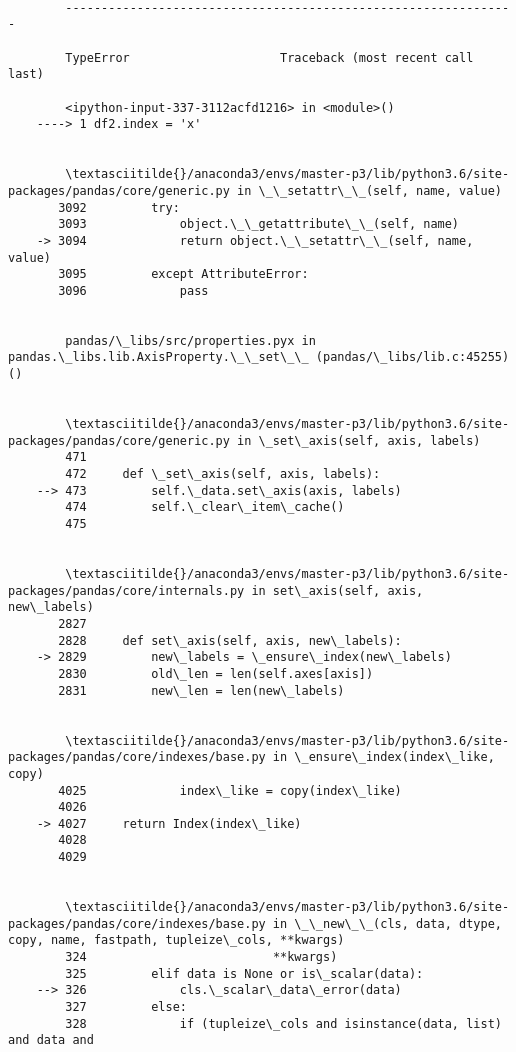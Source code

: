 \documentclass[11pt]{article}
\begin{document}
    \begin{Verbatim}[commandchars=\\\{\}]

        ---------------------------------------------------------------

        TypeError                     Traceback (most recent call last)

        <ipython-input-337-3112acfd1216> in <module>()
    ----> 1 df2.index = 'x'
    

        \textasciitilde{}/anaconda3/envs/master-p3/lib/python3.6/site-packages/pandas/core/generic.py in \_\_setattr\_\_(self, name, value)
       3092         try:
       3093             object.\_\_getattribute\_\_(self, name)
    -> 3094             return object.\_\_setattr\_\_(self, name, value)
       3095         except AttributeError:
       3096             pass


        pandas/\_libs/src/properties.pyx in pandas.\_libs.lib.AxisProperty.\_\_set\_\_ (pandas/\_libs/lib.c:45255)()


        \textasciitilde{}/anaconda3/envs/master-p3/lib/python3.6/site-packages/pandas/core/generic.py in \_set\_axis(self, axis, labels)
        471 
        472     def \_set\_axis(self, axis, labels):
    --> 473         self.\_data.set\_axis(axis, labels)
        474         self.\_clear\_item\_cache()
        475 


        \textasciitilde{}/anaconda3/envs/master-p3/lib/python3.6/site-packages/pandas/core/internals.py in set\_axis(self, axis, new\_labels)
       2827 
       2828     def set\_axis(self, axis, new\_labels):
    -> 2829         new\_labels = \_ensure\_index(new\_labels)
       2830         old\_len = len(self.axes[axis])
       2831         new\_len = len(new\_labels)


        \textasciitilde{}/anaconda3/envs/master-p3/lib/python3.6/site-packages/pandas/core/indexes/base.py in \_ensure\_index(index\_like, copy)
       4025             index\_like = copy(index\_like)
       4026 
    -> 4027     return Index(index\_like)
       4028 
       4029 


        \textasciitilde{}/anaconda3/envs/master-p3/lib/python3.6/site-packages/pandas/core/indexes/base.py in \_\_new\_\_(cls, data, dtype, copy, name, fastpath, tupleize\_cols, **kwargs)
        324                          **kwargs)
        325         elif data is None or is\_scalar(data):
    --> 326             cls.\_scalar\_data\_error(data)
        327         else:
        328             if (tupleize\_cols and isinstance(data, list) and data and



\end{Verbatim}
\end{document}
